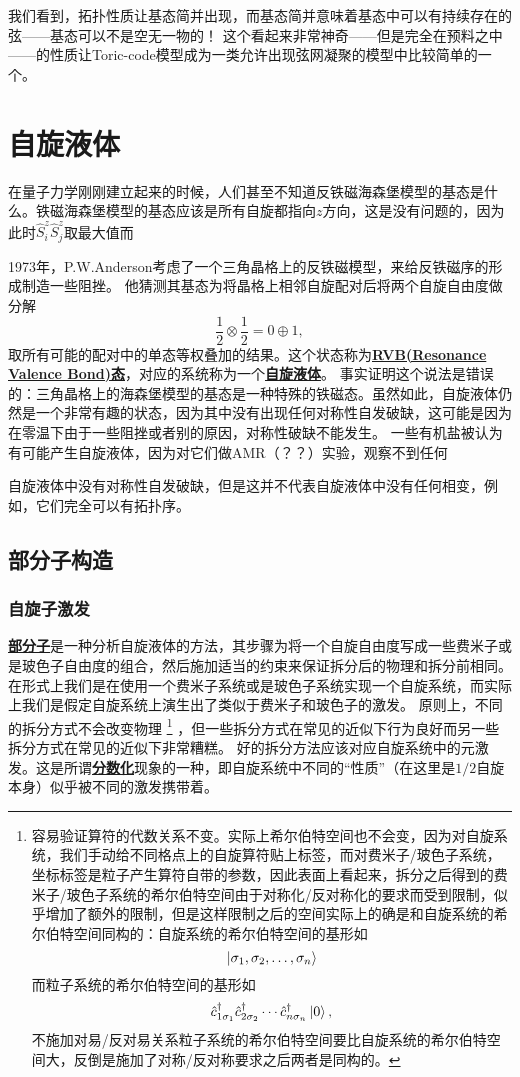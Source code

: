 \documentclass[hyperref, UTF8, a4paper]{ctexart}
\newcommand*{\concept}[1]{\underline{\textbf{#1}}}
\begin{document}
我们看到，拓扑性质让基态简并出现，而基态简并意味着基态中可以有持续存在的弦——基态可以不是空无一物的！
这个看起来非常神奇——但是完全在预料之中——的性质让Toric-code模型成为一类允许出现弦网凝聚的模型中比较简单的一个。

\section{自旋液体}

在量子力学刚刚建立起来的时候，人们甚至不知道反铁磁海森堡模型的基态是什么。铁磁海森堡模型的基态应该是所有自旋都指向$z$方向，这是没有问题的，因为此时$\hat{S}_i^z \hat{S}_j^z$取最大值而

1973年，P.W.Anderson考虑了一个三角晶格上的反铁磁模型，来给反铁磁序的形成制造一些阻挫。
他猜测其基态为将晶格上相邻自旋配对后将两个自旋自由度做分解
\[
    \frac{1}{2} \otimes \frac{1}{2} = 0 \oplus 1,
\]
取所有可能的配对中的单态等权叠加的结果。这个状态称为\concept{RVB(Resonance Valence Bond)态}，对应的系统称为一个\concept{自旋液体}。
事实证明这个说法是错误的：三角晶格上的海森堡模型的基态是一种特殊的铁磁态。虽然如此，自旋液体仍然是一个非常有趣的状态，因为其中没有出现任何对称性自发破缺，这可能是因为在零温下由于一些阻挫或者别的原因，对称性破缺不能发生。
一些有机盐被认为有可能产生自旋液体，因为对它们做AMR（？？）实验，观察不到任何

自旋液体中没有对称性自发破缺，但是这并不代表自旋液体中没有任何相变，例如，它们完全可以有拓扑序。

\subsection{部分子构造}

\subsubsection{自旋子激发}

\concept{部分子}是一种分析自旋液体的方法，其步骤为将一个自旋自由度写成一些费米子或是玻色子自由度的组合，然后施加适当的约束来保证拆分后的物理和拆分前相同。
在形式上我们是在使用一个费米子系统或是玻色子系统实现一个自旋系统，而实际上我们是假定自旋系统上演生出了类似于费米子和玻色子的激发。
原则上，不同的拆分方式不会改变物理%
\footnote{
    容易验证算符的代数关系不变。实际上希尔伯特空间也不会变，因为对自旋系统，我们手动给不同格点上的自旋算符贴上标签，而对费米子/玻色子系统，坐标标签是粒子产生算符自带的参数，因此表面上看起来，拆分之后得到的费米子/玻色子系统的希尔伯特空间由于对称化/反对称化的要求而受到限制，似乎增加了额外的限制，但是这样限制之后的空间实际上的确是和自旋系统的希尔伯特空间同构的：自旋系统的希尔伯特空间的基形如
    \[
        \ket{\sigma_1, \sigma_2, \ldots, \sigma_n}
    \]
    而粒子系统的希尔伯特空间的基形如
    \[
        \hat{c}^\dagger_{1 \sigma_1} \hat{c}^\dagger_{2 \sigma_2} \cdots \hat{c}^\dagger_{n \sigma_n} \ket{0},
    \]
    不施加对易/反对易关系粒子系统的希尔伯特空间要比自旋系统的希尔伯特空间大，反倒是施加了对称/反对称要求之后两者是同构的。
}%
，但一些拆分方式在常见的近似下行为良好而另一些拆分方式在常见的近似下非常糟糕。
好的拆分方法应该对应自旋系统中的元激发。这是所谓\concept{分数化}现象的一种，即自旋系统中不同的“性质”（在这里是$1/2$自旋本身）似乎被不同的激发携带着。
\end{document}

